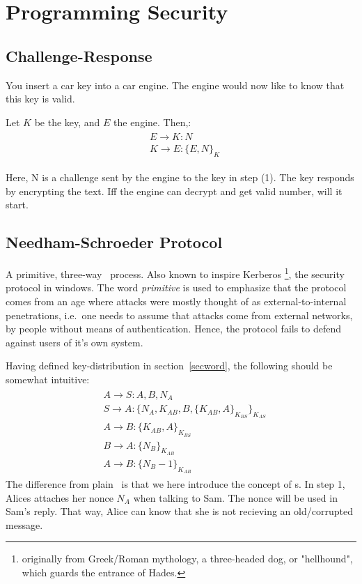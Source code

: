 \section{Programming Security}

\subsection{Challenge-Response}\label{chalres}
You insert a car key into a car engine. The engine would now like to know
that this key is valid.

Let $K$ be the key, and $E$ the engine. Then,:
\begin{gather}
	\begin{align}
		&E \rightarrow K: N \\
		&K \rightarrow E: \{E, N\}_{K}
	\end{align}
\end{gather}

Here, N is a challenge sent by the engine to the key in step (1).
The key responds by encrypting the text. Iff the engine can decrypt
and get valid number, will it start.


\subsection{Needham-Schroeder Protocol}
A primitive, three-way~ process. Also known
to inspire Kerberos%
\footnote{originally from Greek/Roman mythology, a three-headed dog, or "hellhound",
	which guards the entrance of Hades.},
the security protocol in windows. The word \textit{primitive} is used to 
emphasize that the protocol comes from an age where attacks were
mostly thought of as external-to-internal penetrations, i.e.\
one needs to assume that attacks come from external networks,
by people without means of authentication. Hence, the protocol
fails to defend against users of it's own system.

Having defined key-distribution in section~\ref{secword}, the following should 
be somewhat intuitive:
\setcounter{equation}{0}
\begin{gather}
	\begin{align}
		&A \rightarrow S: A,B,N_{A}  \\
		&S \rightarrow A: \{N_A, K_{AB}, B, \{K_{AB}, A\}_{K_{BS}}\}_{K_{AS}} \\ 
		&A \rightarrow B: \{K_{AB}, A\}_{K_{BS}} \\ 
		&B \rightarrow A: \{N_B\}_{K_{AB}} \\
		&A \rightarrow B: \{N_B-1\}_{K_{AB}}
	\end{align}
\end{gather}
The difference from plain~ is that we here introduce the
concept of \nameref{nonce}s.
In step 1, Alices attaches her nonce $N_{A}$ when talking to Sam.
The nonce will be used in Sam's reply. That way, Alice can know that
she is not recieving an old/corrupted message.

